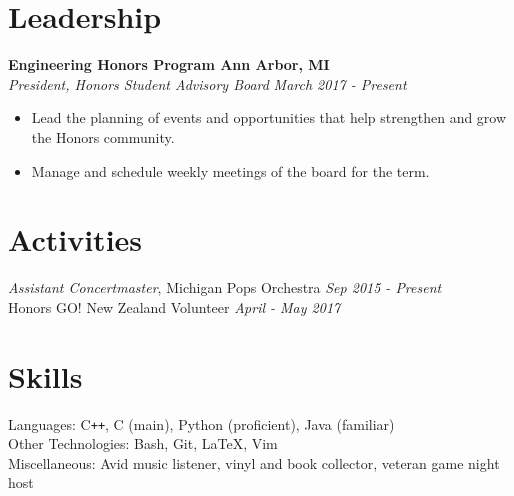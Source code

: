 \documentclass[margin,line]{resume}
\begin{document}
\begin{resume}
	\vspace{1.5mm}
	
	\sectionbreak
	\section{\mysidestyle Leadership}
	\textbf{Engineering Honors Program \hfill Ann Arbor, MI} \\\vspace{1mm}%
	\textsl{President, Honors Student Advisory Board} \hfill \textsl{March 2017 - Present}
	\begin{itemize}[leftmargin=4mm]
		\item Lead the planning of events and opportunities that help strengthen and grow the Honors community.
		\item Manage and schedule weekly meetings of the board for the term.
	\end{itemize}
	
	\vspace{1.5mm}
	
	\sectionbreak
	\section{\mysidestyle Activities}
	\begin{flushright}
		\vspace{-7.5mm}
		\textsl{Assistant Concertmaster}, Michigan Pops Orchestra  \hfill \textsl{Sep 2015 - Present}\\
		Honors GO! New Zealand Volunteer \hfill \textsl{April - May 2017} \\
	\end{flushright}
	\vspace{-1.5mm}
	    
	\sectionbreak
	\section{\mysidestyle Skills}
	Languages: C\texttt{++}, C (main), Python (proficient), Java (familiar) \\ %
	Other Technologies: Bash, Git, \LaTeX, Vim \\
	Miscellaneous:  Avid music listener, vinyl and book collector, veteran game night host
\end{resume}
\end{document}
